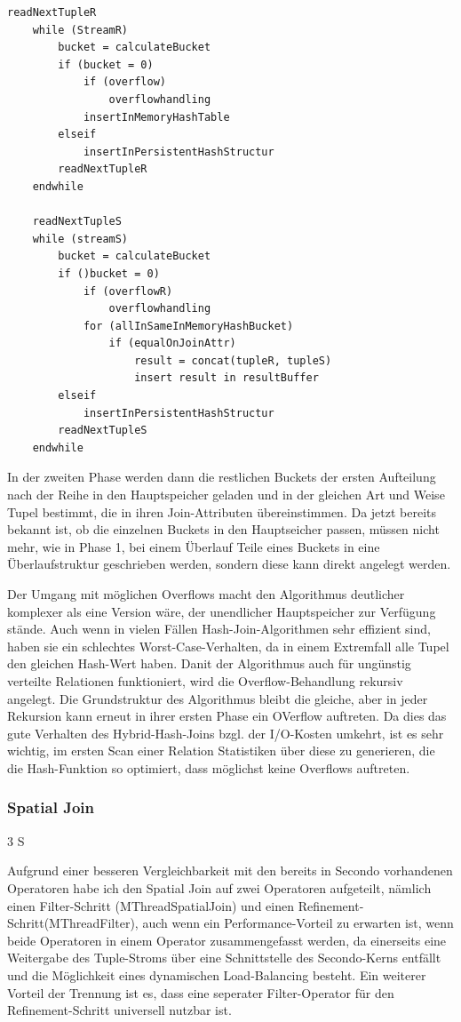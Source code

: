 \documentclass[a4paper,12pt,twoside]{article}
\begin{document}
\begin{minipage}{\linewidth}
	\begin{lstlisting}[caption={Phase 1 Hybrid Hash Join}, label=list:hybrid] 
	readNextTupleR
	while (StreamR) 
	 	bucket = calculateBucket
		if (bucket = 0)
			if (overflow)
				overflowhandling
			insertInMemoryHashTable
		elseif
			insertInPersistentHashStructur
		readNextTupleR
	endwhile
	
	readNextTupleS
	while (streamS)
		bucket = calculateBucket
		if ()bucket = 0)
			if (overflowR)
				overflowhandling
			for (allInSameInMemoryHashBucket)
				if (equalOnJoinAttr)
					result = concat(tupleR, tupleS)
					insert result in resultBuffer
		elseif
			insertInPersistentHashStructur
		readNextTupleS
	endwhile
	\end{lstlisting}
\end{minipage}

In der zweiten Phase werden dann die restlichen Buckets der ersten Aufteilung nach der Reihe in den Hauptspeicher geladen und in der gleichen Art und Weise Tupel bestimmt, die in ihren Join-Attributen übereinstimmen. Da jetzt bereits bekannt ist, ob die einzelnen Buckets in den Hauptseicher passen, müssen nicht mehr, wie in Phase 1, bei einem Überlauf Teile eines Buckets in eine Überlaufstruktur geschrieben werden, sondern diese kann direkt angelegt werden.

Der Umgang mit möglichen Overflows macht den Algorithmus deutlicher komplexer als eine Version wäre, der unendlicher Hauptspeicher zur Verfügung stände. Auch wenn in vielen Fällen Hash-Join-Algorithmen sehr effizient sind, haben sie ein schlechtes Worst-Case-Verhalten, da in einem Extremfall alle Tupel den gleichen Hash-Wert haben. Danit der Algorithmus auch für ungünstig verteilte Relationen funktioniert, wird die Overflow-Behandlung rekursiv angelegt. Die Grundstruktur des Algorithmus bleibt die gleiche, aber in jeder Rekursion kann erneut in ihrer ersten Phase ein OVerflow auftreten. Da dies das gute Verhalten des Hybrid-Hash-Joins bzgl. der I/O-Kosten umkehrt, ist es sehr wichtig, im ersten Scan einer Relation Statistiken über diese zu generieren, die die Hash-Funktion so optimiert, dass möglichst keine Overflows auftreten.

\subsubsection{Spatial Join} 3 S

Aufgrund einer besseren Vergleichbarkeit mit den bereits in Secondo vorhandenen Operatoren habe ich den Spatial Join auf zwei Operatoren aufgeteilt, nämlich einen Filter-Schritt (MThreadSpatialJoin) und einen Refinement-Schritt(MThreadFilter), auch wenn ein Performance-Vorteil zu erwarten ist, wenn beide Operatoren in einem Operator zusammengefasst werden, da einerseits eine Weitergabe des Tuple-Stroms über eine Schnittstelle des Secondo-Kerns entfällt und die Möglichkeit eines dynamischen Load-Balancing besteht. Ein weiterer Vorteil der Trennung ist es, dass eine seperater Filter-Operator für den Refinement-Schritt universell nutzbar ist.
\end{document}
